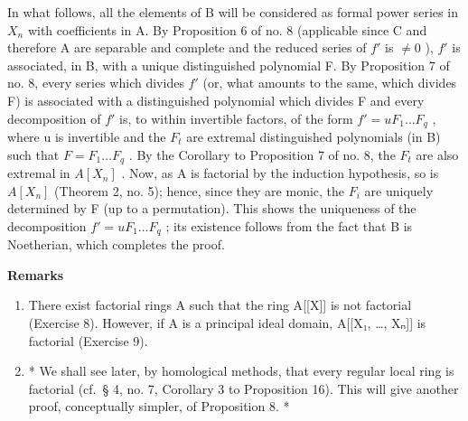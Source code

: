 In what follows, all the elements of B will be considered as formal power series in \(X_{n}\) with coefficients in A. By Proposition 6 of no. 8 (applicable since C and therefore A are separable and complete and the reduced series of \(f'\) is \(\neq0\) ), \(f'\) is associated, in B, with a unique distinguished polynomial F. By Proposition 7 of no. 8, every series which divides \(f'\) (or, what amounts to the same, which divides F) is associated with a distinguished polynomial which divides F and every decomposition of \(f'\) is, to within invertible factors, of the form \(f' = uF_{1}\ldots F_{q}\) , where u is invertible and the \(F_{t}\) are extremal distinguished polynomials (in B) such that \(F = F_{1}\ldots F_{q}\) . By the Corollary to Proposition 7 of no. 8, the \(F_{t}\) are also extremal in \(A[X_{n}]\) . Now, as A is factorial by the induction hypothesis, so is \(A[X_{n}]\) (Theorem 2, no. 5); hence, since they are monic, the \(F_{i}\) are uniquely determined by F (up to a permutation). This shows the uniqueness of the decomposition \(f' = uF_{1} \ldots F_{q}\) ; its existence follows from the fact that B is Noetherian, which completes the proof.

\textbf{Remarks}\par

\begin{enumerate}
\def\labelenumi{(\arabic{enumi})}
\item
  There exist factorial rings A such that the ring A{[}{[}X{]}{]} is not factorial (Exercise 8). However, if A is a principal ideal domain, A{[}{[}X₁, \ldots, Xₙ{]}{]} is factorial (Exercise 9).
\item
  * We shall see later, by homological methods, that every regular local ring is factorial (cf.~§ 4, no. 7, Corollary 3 to Proposition 16). This will give another proof, conceptually simpler, of Proposition 8. *
\end{enumerate}

